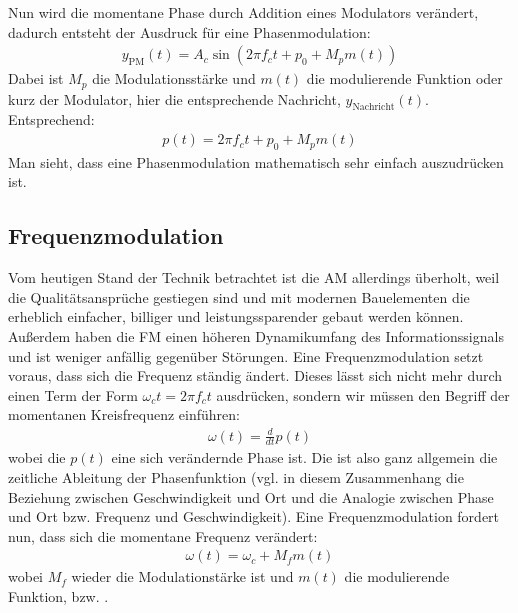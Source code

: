 \documentclass[letterpaper,10pt,english]{jupyterBook}
\begin{document}
\sphinxAtStartPar
Nun wird die momentane Phase durch Addition eines Modulators verändert, dadurch entsteht der Ausdruck für eine Phasenmodulation:
\begin{equation*}
\begin{split} y_\mathrm{PM}(t)= A_c \sin\left(2\pi f_c t  +p_0 + M_p m(t)\right)\end{split}
\end{equation*}
\sphinxAtStartPar
Dabei ist \(M_{p}\) die Modulationsstärke und \(m(t)\) die modulierende Funktion oder kurz der Modulator, hier die entsprechende Nachricht, \(y_\mathrm{Nachricht}(t)\). Entsprechend:
\begin{equation*}
\begin{split} p(t)=2\pi f_c t+p_{0}+M_{p}m(t)\end{split}
\end{equation*}
\sphinxAtStartPar
Man sieht, dass eine Phasenmodulation mathematisch sehr einfach auszudrücken ist.


\subsection{Frequenzmodulation}
\label{\detokenize{content/3_Modulationen:frequenzmodulation}}
\sphinxAtStartPar
Vom heutigen Stand der Technik betrachtet ist die AM allerdings überholt, weil die Qualitätsansprüche gestiegen sind und mit modernen Bauelementen die  erheblich einfacher, billiger und leistungssparender gebaut werden können. Außerdem haben die FM einen höheren Dynamikumfang des Informationssignals und ist weniger anfällig gegenüber Störungen. Eine Frequenzmodulation setzt voraus, dass sich die Frequenz ständig ändert. Dieses lässt sich nicht mehr durch einen Term der Form \(\omega_c t = 2\pi f_c t\) ausdrücken, sondern wir müssen den Begriff der momentanen Kreisfrequenz einführen:
\begin{equation*}
\begin{split}\omega(t) = \frac{d}{dt}p(t)\end{split}
\end{equation*}
\sphinxAtStartPar
wobei die \(p(t)\) eine sich verändernde Phase ist. Die  ist also ganz allgemein die zeitliche Ableitung der Phasenfunktion (vgl. in diesem Zusammenhang die Beziehung zwischen Geschwindigkeit und Ort und die Analogie zwischen Phase und Ort bzw. Frequenz und Geschwindigkeit). Eine Frequenzmodulation fordert nun, dass sich die momentane Frequenz verändert:
\begin{equation*}
\begin{split}\omega (t)=\omega_c+M_{f} m(t)\end{split}
\end{equation*}
\sphinxAtStartPar
wobei \(M_f\) wieder die Modulationstärke ist und \(m(t)\) die modulierende Funktion, bzw. .
\end{document}
